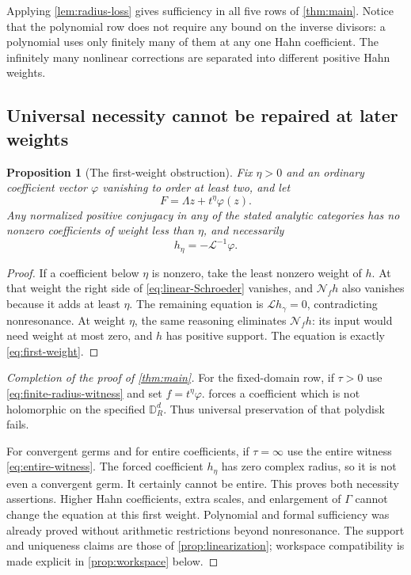 \documentclass[11pt,letterpaper]{article}
\newtheorem{proposition}[proposition]{Proposition}
\theoremstyle{definition}
\theoremstyle{remark}
\newcommand{\DR}{\mathbb D_R^d}
\newcommand{\Li}{\mathcal L}
\newcommand{\NN}{\mathcal N}
\numberwithin{equation}{section}
\begin{document}
Applying \cref{lem:radius-loss} gives sufficiency in all five rows of
\cref{thm:main}. Notice that the polynomial row does not require any bound
on the inverse divisors: a polynomial uses only finitely many of them at
any one Hahn coefficient. The infinitely many nonlinear corrections are
separated into different positive Hahn weights.

\subsection{Universal necessity cannot be repaired at later weights}
\begin{proposition}[The first-weight obstruction]\label{prop:first-weight}
Fix $\eta>0$ and an ordinary coefficient vector $\varphi$ vanishing to
order at least two, and let
\[
 F=\Lambda z+t^\eta\varphi(z).
\]
Any normalized positive conjugacy in any of the stated analytic categories
has no nonzero coefficients of weight less than $\eta$, and necessarily
\begin{equation}\label{eq:first-weight}
 h_\eta=-\Li^{-1}\varphi.
\end{equation}
\end{proposition}
\begin{proof}
If a coefficient below $\eta$ is nonzero, take the least nonzero weight of
$h$. At that weight the right side of \eqref{eq:linear-Schroeder} vanishes,
and $\NN_fh$ also vanishes because it adds at least $\eta$. The remaining
equation is $\Li h_\gamma=0$, contradicting nonresonance. At weight
$\eta$, the same reasoning eliminates $\NN_fh$: its input would need
weight at most zero, and $h$ has positive support. The equation is exactly
\eqref{eq:first-weight}.
\end{proof}

\begin{proof}[Completion of the proof of \cref{thm:main}]
For the fixed-domain row, if $\tau>0$ use
\eqref{eq:finite-radius-witness} and set $f=t^\eta\varphi$.
 forces a coefficient which is not holomorphic on
the specified $\DR$. Thus universal preservation of that polydisk fails.

For convergent germs and for entire coefficients, if $\tau=\infty$ use
the entire witness \eqref{eq:entire-witness}. The forced coefficient
$h_\eta$ has zero complex radius, so it is not even a convergent germ.
It certainly cannot be entire. This proves both necessity assertions.
Higher Hahn coefficients, extra scales, and enlargement of $\Gamma$ cannot
change the equation at this first weight. Polynomial and formal sufficiency
was already proved without arithmetic restrictions beyond nonresonance.
The support and uniqueness claims are those of
\cref{prop:linearization}; workspace compatibility is made explicit in
\cref{prop:workspace} below.
\end{proof}
\end{document}
